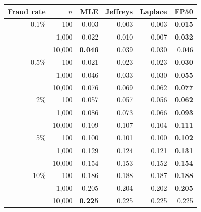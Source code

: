 \begin{tabular}{rrrrrr}\toprule
Fraud rate & $n$ & MLE & Jeffreys & Laplace & FP50\\\midrule
0.1\% & 100 & 0.003 & 0.003 & 0.003 & \textbf{0.015}\\
 & 1,000 & 0.022 & 0.010 & 0.007 & \textbf{0.032}\\
 & 10,000 & \textbf{0.046} & 0.039 & 0.030 & 0.046\\
\midrule
0.5\% & 100 & 0.021 & 0.023 & 0.023 & \textbf{0.030}\\
 & 1,000 & 0.046 & 0.033 & 0.030 & \textbf{0.055}\\
 & 10,000 & 0.076 & 0.069 & 0.062 & \textbf{0.077}\\
\midrule
2\% & 100 & 0.057 & 0.057 & 0.056 & \textbf{0.062}\\
 & 1,000 & 0.086 & 0.073 & 0.066 & \textbf{0.093}\\
 & 10,000 & 0.109 & 0.107 & 0.104 & \textbf{0.111}\\
\midrule
5\% & 100 & 0.100 & 0.101 & 0.100 & \textbf{0.102}\\
 & 1,000 & 0.129 & 0.124 & 0.121 & \textbf{0.131}\\
 & 10,000 & 0.154 & 0.153 & 0.152 & \textbf{0.154}\\
\midrule
10\% & 100 & 0.186 & 0.188 & 0.187 & \textbf{0.188}\\
 & 1,000 & 0.205 & 0.204 & 0.202 & \textbf{0.205}\\
 & 10,000 & \textbf{0.225} & 0.225 & 0.225 & 0.225\\
\bottomrule\end{tabular}